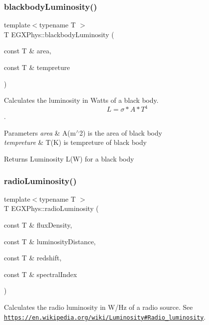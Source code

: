 \subsubsection{\texorpdfstring{blackbody\+Luminosity()}{blackbodyLuminosity()}}
{\footnotesize\ttfamily template$<$typename T $>$ \\
T E\+G\+X\+Phys\+::blackbody\+Luminosity (\begin{DoxyParamCaption}\item[{const T \&}]{area,  }\item[{const T \&}]{tempreture }\end{DoxyParamCaption})}



Calculates the luminosity in Watts of a black body. \[L=\sigma*A*T^4\]. 


\begin{DoxyParams}{Parameters}
{\em area} & A(m$^\wedge$2) is the area of black body \\
\hline
{\em tempreture} & T(\+K) is tempreture of black body \\
\hline
\end{DoxyParams}
\begin{DoxyReturn}{Returns}
Luminosity L(\+W) for a black body 
\end{DoxyReturn}
\mbox{\label{group___astrophysics_ga6d6865b2aac1bc7c7f06b7c4ac2444e4}} 
\subsubsection{\texorpdfstring{radio\+Luminosity()}{radioLuminosity()}}
{\footnotesize\ttfamily template$<$typename T $>$ \\
T E\+G\+X\+Phys\+::radio\+Luminosity (\begin{DoxyParamCaption}\item[{const T \&}]{flux\+Density,  }\item[{const T \&}]{luminosity\+Distance,  }\item[{const T \&}]{redshift,  }\item[{const T \&}]{spectral\+Index }\end{DoxyParamCaption})}



Calculates the radio luminosity in W/\+Hz of a radio source. See \href{https://en.wikipedia.org/wiki/Luminosity#Radio_luminosity}{\tt https\+://en.\+wikipedia.\+org/wiki/\+Luminosity\#\+Radio\+\_\+luminosity}. 



